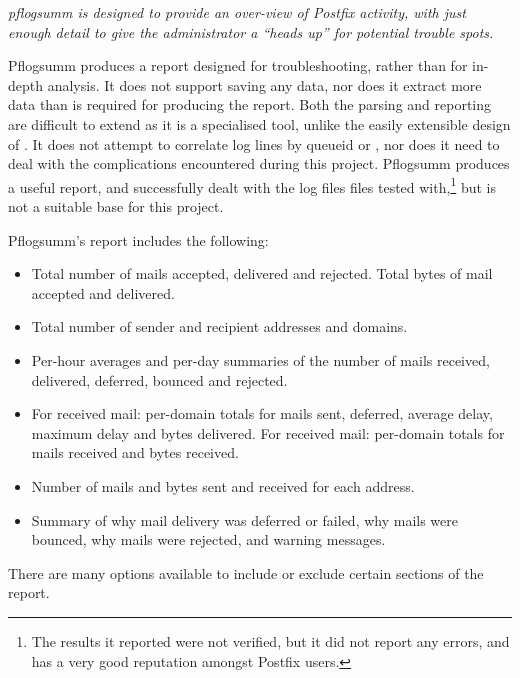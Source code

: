 \textit{pflogsumm is designed to provide an over-view of Postfix activity,
with just enough detail to give the administrator a ``heads up'' for
potential trouble spots.\/}

Pflogsumm produces a report designed for troubleshooting, rather than for
in-depth analysis.  It does not support saving any data, nor does it
extract more data than is required for producing the report.  Both the
parsing and reporting are difficult to extend as it is a specialised tool,
unlike the easily extensible design of \parsername{}.  It does not attempt
to correlate log lines by queueid or \pid{}, nor does it need to deal with
the complications encountered during this project.  Pflogsumm produces a
useful report, and successfully dealt with the \numberOFlogFILES{} log
files files tested with,\footnote{The results it reported were not
verified, but it did not report any errors, and has a very good reputation
amongst Postfix users.} but is not a suitable base for this project.

Pflogsumm's report includes the following:

\begin{itemize}

    \item Total number of mails accepted, delivered and rejected.  Total
        bytes of mail accepted and delivered.

    \item Total number of sender and recipient addresses and domains.

    \item Per-hour averages and per-day summaries of the number of mails
        received, delivered, deferred, bounced and rejected.

    \item For received mail: per-domain totals for mails sent, deferred,
        average delay, maximum delay and bytes delivered.  For received
        mail: per-domain totals for mails received and bytes received.

    \item Number of mails and bytes sent and received for each address.

    \item Summary of why mail delivery was deferred or failed, why mails
        were bounced, why mails were rejected, and warning messages.

\end{itemize}

There are many options available to include or exclude certain sections of
the report.

